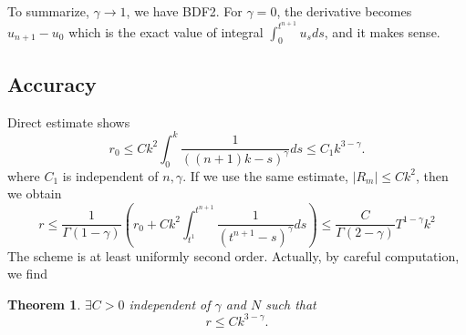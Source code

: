 \documentclass[11pt]{article}
\newtheorem{thm}{Theorem}
\begin{document}
To summarize, $\gamma\to 1$, we have BDF2.  
For $\gamma=0$, the derivative becomes $u_{n+1}-u_0$ which is the exact value of integral $\int_0^{t^{n+1}}u_s ds$, and it makes sense.

\subsection{Accuracy}
Direct estimate shows $$
r_0\le Ck^2\int_0^k\frac{1}{((n+1)k-s)^{\gamma}}ds\le C_1k^{3-\gamma}.
$$
where $C_1$ is independent of $n,\gamma$. If we use the same estimate, $|R_m|\le Ck^2$, then we obtain $$
r\le \frac{1}{\Gamma(1-\gamma)}(r_0+Ck^2\int_{t^1}^{t^{n+1}}\frac{1}{(t^{n+1}-s)^{\gamma}}ds)\le \frac{C}{\Gamma(2-\gamma)}T^{1-\gamma}k^2
$$
The scheme is at least uniformly second order. Actually, by careful computation, we find
\begin{thm}
$\exists C>0$ independent of $\gamma$ and $N$ such that $$
r\le Ck^{3-\gamma}.
$$
\end{thm}
\end{document}
